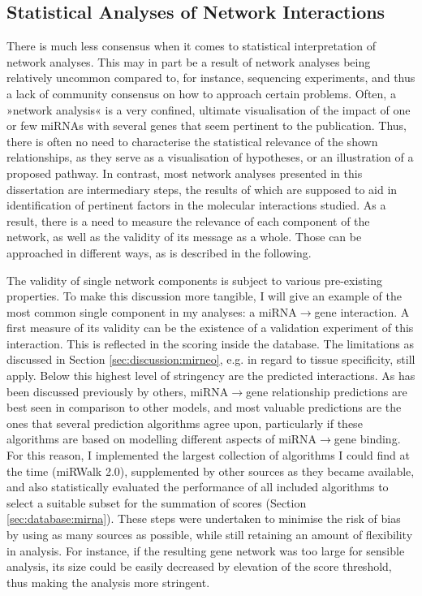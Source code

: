 \subsection{Statistical Analyses of Network Interactions} \label{sec:discussion:network-statistics}
There is much less consensus when it comes to statistical interpretation of network analyses. This may in part be a result of network analyses being relatively uncommon compared to, for instance, sequencing experiments, and thus a lack of community consensus on how to approach certain problems. Often, a »network analysis« is a very confined, ultimate visualisation of the impact of one or few miRNAs with several genes that seem pertinent to the publication. Thus, there is often no need to characterise the statistical relevance of the shown relationships, as they serve as a visualisation of hypotheses, or an illustration of a proposed pathway. In contrast, most network analyses presented in this dissertation are intermediary steps, the results of which are supposed to aid in identification of pertinent factors in the molecular interactions studied. As a result, there is a need to measure the relevance of each component of the network, as well as the validity of its message as a whole. Those can be approached in different ways, as is described in the following.

The validity of single network components is subject to various pre-existing properties. To make this discussion more tangible, I will give an example of the most common single component in my analyses: a miRNA$\to$gene interaction. A first measure of its validity can be the existence of a validation experiment of this interaction. This is reflected in the scoring inside the database. The limitations as discussed in Section \ref{sec:discussion:mirneo}, e.g. in regard to tissue specificity, still apply. Below this highest level of stringency are the predicted interactions. As has been discussed previously by others, miRNA$\to$gene relationship predictions are best seen in comparison to other models, and most valuable predictions are the ones that several prediction algorithms agree upon, particularly if these algorithms are based on modelling different aspects of miRNA$\to$gene binding.\cite{Witkos2011} For this reason, I implemented the largest collection of algorithms I could find at the time (miRWalk 2.0\cite{Dweep2015}), supplemented by other sources as they became available, and also statistically evaluated the performance of all included algorithms to select a suitable subset for the summation of scores (Section \ref{sec:database:mirna}). These steps were undertaken to minimise the risk of bias by using as many sources as possible, while still retaining an amount of flexibility in analysis. For instance, if the resulting gene network was too large for sensible analysis, its size could be easily decreased by elevation of the score threshold, thus making the analysis more stringent.


